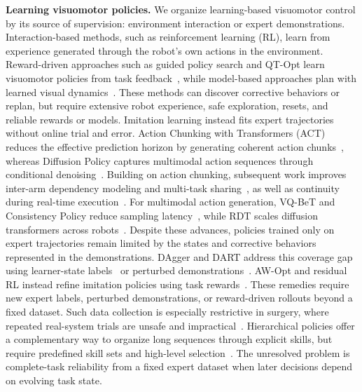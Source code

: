 \noindent\textbf{Learning visuomotor policies.}
We organize learning-based visuomotor control by its source of supervision: environment interaction or expert demonstrations.
Interaction-based methods, such as reinforcement learning (RL), learn from experience generated through the robot's own actions in the environment.
Reward-driven approaches such as guided policy search and QT-Opt learn visuomotor policies from task feedback~\cite{levine2016visuomotor,kalashnikov2018qtopt},
while model-based approaches plan with learned visual dynamics~\cite{finn2017foresight,ebert2017visualplanning}.
These methods can discover corrective behaviors or replan, but require extensive robot experience, safe exploration, resets, and reliable rewards or models.
Imitation learning instead fits expert trajectories without online trial and error.
Action Chunking with Transformers (ACT) reduces the effective prediction horizon
by generating coherent action chunks~\cite{zhao2023act},
whereas Diffusion Policy captures multimodal action sequences through conditional denoising~\cite{chi2023diffusion}.
Building on action chunking, subsequent work improves inter-arm dependency modeling and multi-task sharing~\cite{lee2025interact,haldar2024baku},
as well as continuity during real-time execution~\cite{wang2026remac,liu2026legato}.
For multimodal action generation, VQ-BeT and Consistency Policy reduce sampling latency~\cite{lee2024vqbet,prasad2024consistency},
while RDT scales diffusion transformers across robots~\cite{liu2025rdt}.
Despite these advances, policies trained only on expert trajectories remain limited by the states and corrective behaviors represented in the demonstrations.
DAgger and DART address this coverage gap using learner-state labels~\cite{ross2011} or perturbed demonstrations~\cite{laskey2017dart}.
AW-Opt and residual RL instead refine imitation policies using task rewards~\cite{lu2022awopt,ankile2024resip}.
These remedies require new expert labels, perturbed demonstrations, or reward-driven rollouts beyond a fixed dataset.
Such data collection is especially restrictive in surgery, where repeated real-system trials are unsafe and impractical~\cite{dallalba2024ffsrl}.
Hierarchical policies offer a complementary way to organize long sequences through explicit skills,
but require predefined skill sets and high-level selection~\cite{luo2024cable}.
The unresolved problem is complete-task reliability from a fixed expert dataset when later decisions depend on evolving task state.

